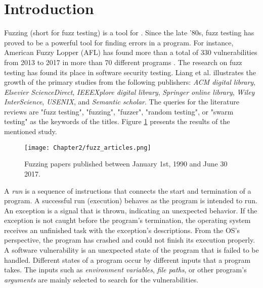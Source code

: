 \section{Introduction} \label{sec:2.1}


Fuzzing (short for fuzz testing) is a tool for 
. Since the late '80s, fuzz testing has proved to be a powerful tool for finding errors in a program. For instance, American Fuzzy Lopper (AFL) has found more than a total of 330 vulnerabilities from 2013 to 2017 in more than 70 different programs \cite{afl_cve}. The research on fuzz testing has found its place in software security testing. Liang et al. \cite{liang2018fuzzing} illustrates the growth of the primary studies from the following publishers: \textit{ACM digital library}, \textit{Elsevier ScienceDirect}, \textit{IEEEXplore digital library}, \textit{Springer online library}, \textit{Wiley InterScience}, \textit{USENIX}, and \textit{Semantic scholar}. The queries for the literature reviews are "fuzz testing", "fuzzing", "fuzzer", "random testing", or "swarm testing" as the keywords of the titles. Figure \ref{fig:fuzz_articles} presents the results of the mentioned study.

\begin{figure}[!t]
    \texttt{[image: Chapter2/fuzz\_articles.png]}
    \centering
    \caption{Fuzzing papers published between January 1st, 1990 and June 30 2017. \cite{liang2018fuzzing}}
    \label{fig:fuzz_articles}
\end{figure}

A \textit{run} is a sequence of instructions that connects the start and termination of a program. A successful run (execution) behaves as the program is intended to run. An exception is a signal that is thrown, indicating an unexpected behavior. If the exception is not caught before the program's termination, the operating system receives an unfinished task with the exception's descriptions. From the OS's perspective, the program has crashed and could not finish its execution properly. A software vulnerability is an unexpected state of the program that is failed to be handled. Different states of a program occur by different inputs that a program takes. The inputs such as \textit{environment variables}, \textit{file paths}, or other program's \textit{arguments} are mainly selected to search for the vulnerabilities. 

